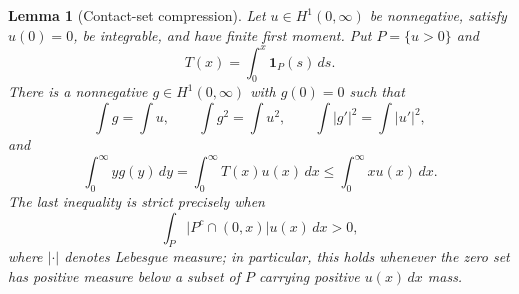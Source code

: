 \documentclass[11pt]{amsart}
\newtheorem{lemma}[theorem]{Lemma}
\theoremstyle{definition}
\theoremstyle{remark}
\begin{document}
\begin{lemma}[Contact-set compression]\label{lem:compression}
Let $u\in H^1(0,\infty)$ be nonnegative, satisfy $u(0)=0$, be integrable,
and have finite first moment. Put $P=\{u>0\}$ and
\[
 T(x)=\int_0^x\mathbf1_P(s)\,ds.
\]
There is a nonnegative $g\in H^1(0,\infty)$ with $g(0)=0$ such that
\begin{equation}\label{eq:compression-invariants}
 \int g=\int u,
 \qquad \int g^2=\int u^2,
 \qquad \int |g'|^2=\int |u'|^2,
\end{equation}
and
\begin{equation}\label{eq:compression-moment}
 \int_0^\infty yg(y)\,dy
 =\int_0^\infty T(x)u(x)\,dx
 \leq\int_0^\infty xu(x)\,dx.
\end{equation}
The last inequality is strict precisely when
\[
 \int_P\bigl|P^c\cap(0,x)\bigr|u(x)\,dx>0,
\]
where $|\cdot|$ denotes Lebesgue measure; in particular, this holds whenever
the zero set has positive measure below a subset of $P$ carrying positive
$u(x)\,dx$ mass.
\end{lemma}
\end{document}
